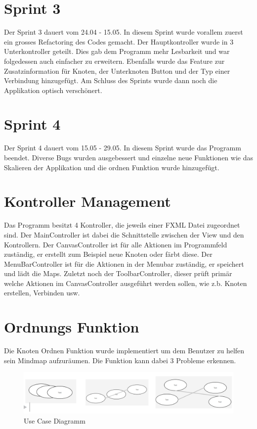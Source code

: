 \section{Sprint 3}
\label{sec:sprint_3}
Der Sprint 3 dauert vom 24.04 - 15.05. In diesem Sprint wurde vorallem zuerst ein grosses Refactoring des Codes gemacht. Der Hauptkontroller wurde in 3 Unterkontroller geteilt. Dies gab dem Programm mehr Lesbarkeit und war folgedessen auch einfacher zu erweitern. Ebenfalls wurde das Feature zur Zusatzinformation für Knoten, der Unterknoten Button und der Typ einer Verbindung hinzugefügt. Am Schluss des Sprints wurde dann noch die Applikation optisch verschönert.
\section{Sprint 4}
\label{sec:sprint_4}
Der Sprint 4 dauert vom 15.05 - 29.05. In diesem Sprint wurde das Programm beendet. Diverse Bugs wurden ausgebessert und einzelne neue Funktionen wie das Skalieren der Applikation und die ordnen Funktion wurde hinzugefügt. 

\section{Kontroller Management}
\label{sec:controller_mgmnt}
Das Programm besitzt 4 Kontroller, die jeweils einer FXML Datei zugeordnet sind. Der MainController ist dabei die Schnittstelle zwischen der View und den Kontrollern. Der CanvasController ist für alle Aktionen im Programmfeld zuständig, er erstellt zum Beispiel neue Knoten oder färbt diese. Der MenuBarController ist für die Aktionen in der Menubar zuständig, er speichert und lädt die Maps. Zuletzt noch der ToolbarController, dieser prüft primär welche Aktionen im CanvasController ausgeführt werden sollen, wie z.b. Knoten erstellen, Verbinden usw.

\section{Ordnungs Funktion}
\label{sec:controller_mgmnt}
Die Knoten Ordnen Funktion wurde implementiert um dem Benutzer zu helfen sein Mindmap aufzuräumen.
Die Funktion kann dabei 3 Probleme erkennen. 
\begin{figure}[H]
	\centering
		\includegraphics[scale=0.5]{images/threeissues.PNG}
	\caption{Use Case Diagramm}
	\label{fig:use_case_diagramm}
\end{figure}

